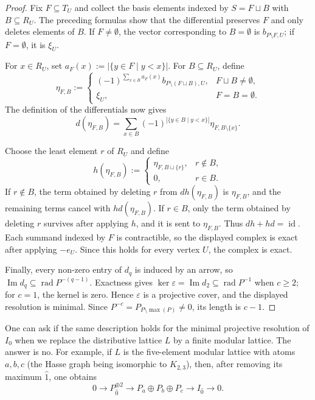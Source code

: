\documentclass[a4paper,leqno]{amsart}
\begin{document}
\begin{proof}
Fix $F\subseteq T_U$ and collect the basis elements indexed by $S=F\sqcup B$ with $B\subseteq R_U$.  The preceding formulas show that the differential preserves $F$ and only deletes elements of $B$.  If $F\neq\emptyset$, the vector corresponding to $B=\emptyset$ is $b_{P\setminus F,U}$; if $F=\emptyset$, it is $\xi_U$.

For $x\in R_U$, set $a_F(x):=|\{y\in F\mid y<x\}|$.  For $B\subseteq R_U$, define
\[
\eta_{F,B}:=
\begin{cases}
(-1)^{\sum_{x\in B}a_F(x)}
b_{P\setminus(F\sqcup B),U},&F\sqcup B\neq\emptyset,\\
\xi_U,&F=B=\emptyset.
\end{cases}
\]
The definition of the differentials now gives
\[
d(\eta_{F,B})
=\sum_{x\in B}
(-1)^{|\{y\in B\mid y<x\}|}
\eta_{F,B\setminus\{x\}}.
\]

Choose the least element $r$ of $R_U$ and define
\[
h(\eta_{F,B})
:=
\begin{cases}
\eta_{F,B\sqcup\{r\}},&r\notin B,\\
0,&r\in B.
\end{cases}
\]
If $r\notin B$, the term obtained by deleting $r$ from $dh(\eta_{F,B})$ is $\eta_{F,B}$, and the remaining terms cancel with $hd(\eta_{F,B})$.  If $r\in B$, only the term obtained by deleting $r$ survives after applying $h$, and it is sent to $\eta_{F,B}$.  Thus $dh+hd=\operatorname{id}$.  Each summand indexed by $F$ is contractible, so the displayed complex is exact after
applying $-e_U$.  Since this holds for every vertex $U$, the complex
is exact.

Finally, every non-zero entry of $d_q$ is induced by an arrow, so $\operatorname{Im}d_q\subseteq\operatorname{rad}P^{-(q-1)}$.  Exactness gives $\ker\varepsilon=\operatorname{Im}d_2\subseteq\operatorname{rad}P^{-1}$ when $c\geq2$; for $c=1$, the kernel is zero.  Hence $\varepsilon$ is a projective cover, and the displayed resolution is minimal.  Since $P^{-c}=P_{P\setminus\max(P)}\neq0$, its length is $c-1$.
\end{proof}

\begin{rmk}
One can ask if the same description holds for the minimal projective resolution of $I_{0}$ when we replace the distributive lattice $L$ by a finite modular lattice.  The answer is no.
For example, if $L$ is the five-element modular lattice with atoms $a,b,c$ (the Hasse graph being isomorphic to $K_{2,3}$), then, after removing its maximum $\hat 1$, one obtains
$$0\longrightarrow P_{\hat 0}^{\oplus 2}
\longrightarrow P_a\oplus P_b\oplus P_c
\longrightarrow I_{\hat 0}
\longrightarrow 0.$$
\end{rmk}
\end{document}
